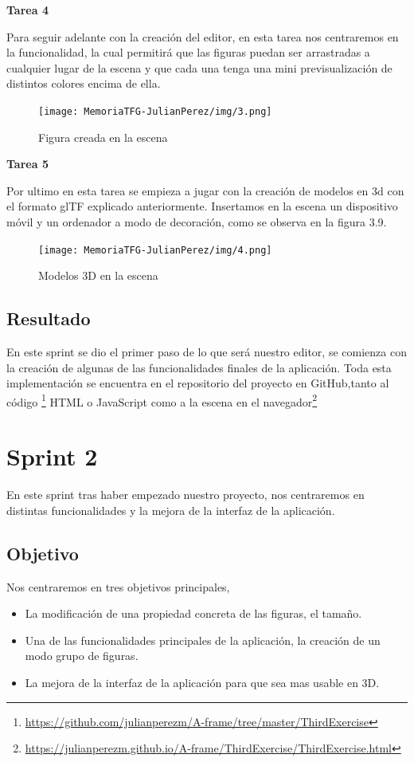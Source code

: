 \documentclass[a4paper, 12pt]{book}
\begin{document}
\textbf{Tarea 4}

Para seguir adelante con la creación del editor, en esta tarea nos centraremos en la funcionalidad, la cual permitirá que las figuras puedan ser arrastradas a cualquier lugar de la escena y que cada una tenga una mini previsualización de distintos colores encima de ella.          \begin{figure}[H]
  \centering
  \texttt{[image: MemoriaTFG-JulianPerez/img/3.png]}
  \caption{Figura creada en la escena}\label{scrum}
\end{figure}

\textbf{Tarea 5}

Por ultimo en esta tarea se empieza a jugar con la creación de modelos en 3d con el formato glTF explicado anteriormente. Insertamos en la escena un dispositivo móvil y un ordenador a modo de decoración, como se observa en la figura 3.9.
\begin{figure}[H]
  \centering
  \texttt{[image: MemoriaTFG-JulianPerez/img/4.png]}
  \caption{Modelos 3D en la escena}\label{scrum}
\end{figure}

\subsection{Resultado}
En este sprint se dio el primer paso de lo que será nuestro editor, se comienza con la creación de algunas de las funcionalidades finales de la aplicación. Toda esta implementación se encuentra en el repositorio del proyecto en GitHub,tanto al código \footnote{\url{https://github.com/julianperezm/A-frame/tree/master/ThirdExercise}} HTML o JavaScript como a la escena en el navegador\footnote{\url{https://julianperezm.github.io/A-frame/ThirdExercise/ThirdExercise.html}}

\section{Sprint 2}
En este sprint tras haber empezado nuestro proyecto, nos centraremos en distintas funcionalidades y la mejora de la interfaz de la aplicación.

\subsection{Objetivo}
Nos centraremos en tres objetivos principales, 

\begin{itemize}
    \item La modificación de una propiedad concreta de las figuras, el tamaño.
    \item Una de las funcionalidades principales de la aplicación, la creación de un modo grupo de figuras.
    \item La mejora de la interfaz de la aplicación para que sea mas usable en 3D.
\end{itemize}
\end{document}
